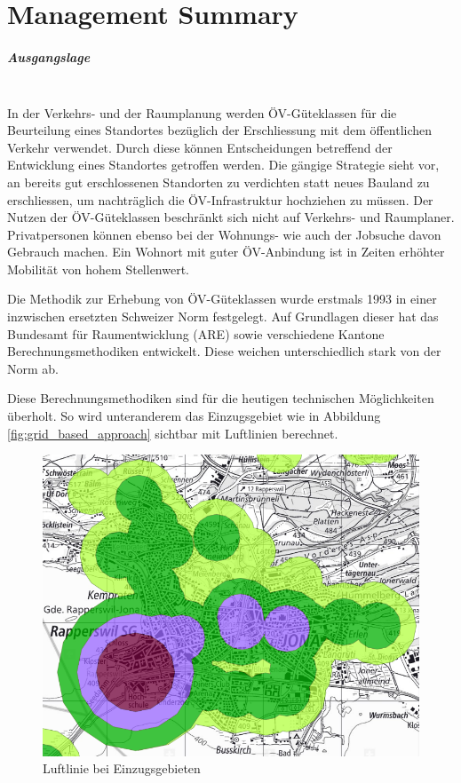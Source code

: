 
\chapter*{Management Summary}

\paragraph{Ausgangslage}~\\
In der Verkehrs- und der Raumplanung werden ÖV-Güteklassen für die Beurteilung eines Standortes bezüglich der Erschliessung mit dem öffentlichen Verkehr verwendet.
Durch diese können Entscheidungen betreffend der Entwicklung eines Standortes getroffen werden.
Die gängige Strategie sieht vor, an bereits gut erschlossenen Standorten zu verdichten statt neues Bauland zu erschliessen, um nachträglich die ÖV-Infrastruktur hochziehen zu müssen.
Der Nutzen der ÖV-Güteklassen beschränkt sich nicht auf Verkehrs- und Raumplaner.
Privatpersonen können ebenso bei der Wohnungs- wie auch der Jobsuche davon Gebrauch machen.
Ein Wohnort mit guter ÖV-Anbindung ist in Zeiten erhöhter Mobilität von hohem Stellenwert.

Die Methodik zur Erhebung von ÖV-Güteklassen wurde erstmals 1993 in einer inzwischen ersetzten Schweizer Norm festgelegt.
Auf Grundlagen dieser hat das Bundesamt für Raumentwicklung (ARE) sowie verschiedene Kantone Berechnungsmethodiken entwickelt.
Diese weichen unterschiedlich stark von der Norm ab.

Diese Berechnungsmethodiken sind für die heutigen technischen Möglichkeiten überholt.
So wird unteranderem das Einzugsgebiet wie in Abbildung \ref{fig:grid_based_approach} sichtbar mit Luftlinien berechnet. 

\begin{figure}[ht]
    \centering
    \includegraphics[width=0.50\linewidth]{start/img/air_line_ARE.png}
    \caption[Luftlinie bei Einzugsgebieten]{Luftlinie bei Einzugsgebieten~\cite{berechnung_are}}
    \label{fig:air_line_ARE}
\end{figure}


